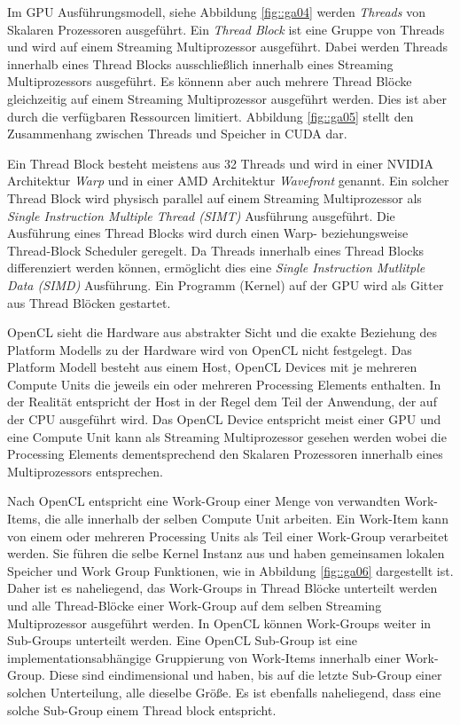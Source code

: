 Im GPU Ausführungsmodell, siehe Abbildung \ref{fig::ga04} werden \emph{Threads} von Skalaren Prozessoren ausgeführt.
Ein \emph{Thread Block} ist eine Gruppe von Threads und wird auf einem Streaming Multiprozessor ausgeführt.
Dabei werden Threads innerhalb eines Thread Blocks ausschließlich innerhalb eines Streaming Multiprozessors ausgeführt.
Es könnenn aber auch mehrere Thread Blöcke gleichzeitig auf einem Streaming Multiprozessor ausgeführt werden.
Dies ist aber durch die verfügbaren Ressourcen limitiert.
Abbildung \ref{fig::ga05} stellt den Zusammenhang zwischen Threads und Speicher in CUDA dar.

Ein Thread Block besteht meistens aus 32 Threads und wird in einer NVIDIA Architektur \emph{Warp} und in einer AMD Architektur \emph{Wavefront} genannt.
Ein solcher Thread Block wird physisch parallel auf einem Streaming Multiprozessor als \emph{Single Instruction Multiple Thread (SIMT)} Ausführung ausgeführt.
Die Ausführung eines Thread Blocks wird durch einen Warp- beziehungsweise Thread-Block Scheduler geregelt.
Da Threads innerhalb eines Thread Blocks differenziert werden können, ermöglicht dies eine \emph{Single Instruction Mutlitple Data (SIMD)} Ausführung.
Ein Programm (Kernel) auf der GPU wird als Gitter aus Thread Blöcken gestartet.

OpenCL sieht die Hardware aus abstrakter Sicht und die exakte Beziehung des Platform Modells zu der Hardware wird von OpenCL nicht festgelegt.
Das Platform Modell besteht aus einem Host, OpenCL Devices mit je mehreren Compute Units die jeweils ein oder mehreren Processing Elements enthalten.
In der Realität entspricht der Host in der Regel dem Teil der Anwendung, der auf der CPU ausgeführt wird.
Das OpenCL Device entspricht meist einer GPU und eine Compute Unit kann als Streaming Multiprozessor gesehen werden wobei die Processing Elements dementsprechend den Skalaren Prozessoren innerhalb eines Multiprozessors entsprechen.

Nach OpenCL entspricht eine Work-Group einer Menge von verwandten Work-Items, die alle innerhalb der selben Compute Unit arbeiten.
Ein Work-Item kann von einem oder mehreren Processing Units als Teil einer Work-Group verarbeitet werden.
Sie führen die selbe Kernel Instanz aus und haben gemeinsamen lokalen Speicher und Work Group Funktionen, wie in Abbildung \ref{fig::ga06} dargestellt ist.
Daher ist es naheliegend, das Work-Groups in Thread Blöcke unterteilt werden und alle Thread-Blöcke einer Work-Group auf dem selben Streaming Multiprozessor ausgeführt werden.
In OpenCL können Work-Groups weiter in Sub-Groups unterteilt werden.
Eine OpenCL Sub-Group ist eine implementationsabhängige Gruppierung von Work-Items innerhalb einer Work-Group.
Diese sind eindimensional und haben, bis auf die letzte Sub-Group einer solchen Unterteilung, alle dieselbe Größe.
Es ist ebenfalls naheliegend, dass eine solche Sub-Group einem Thread block entspricht.

